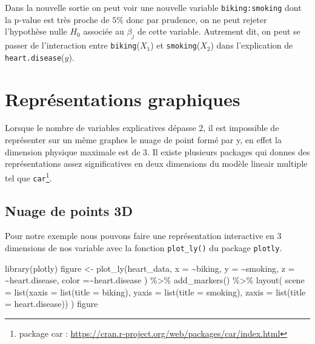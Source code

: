 \documentclass[
]{book}
\newenvironment{Shaded}{\begin{snugshade}}{\end{snugshade}}
\newcommand{\AttributeTok}[1]{\textcolor[rgb]{0.77,0.63,0.00}{#1}}
\newcommand{\FunctionTok}[1]{\textcolor[rgb]{0.00,0.00,0.00}{#1}}
\newcommand{\NormalTok}[1]{#1}
\newcommand{\OtherTok}[1]{\textcolor[rgb]{0.56,0.35,0.01}{#1}}
\newcommand{\SpecialCharTok}[1]{\textcolor[rgb]{0.00,0.00,0.00}{#1}}
\newcommand{\StringTok}[1]{\textcolor[rgb]{0.31,0.60,0.02}{#1}}
\begin{document}
Dans la nouvelle sortie on peut voir une nouvelle variable \texttt{biking:smoking} dont la p-value est très proche de \(5\%\) donc par prudence, on ne peut rejeter l'hypothèse nulle \(H_0\) associée au \(\beta_j\) de cette variable. Autrement dit, on peut se passer de l'interaction entre \texttt{biking}(\(X_1\)) et \texttt{smoking}(\(X_2\)) dans l'explication de \texttt{heart.disease}(\(y\)).

\hypertarget{repruxe9sentations-graphiques-1}{%
\section{Représentations graphiques}\label{repruxe9sentations-graphiques-1}}

Lorsque le nombre de variables explicatives dépasse 2, il est impossible de représenter sur un même graphes le nuage de point formé par y, en effet la dimension physique maximale est de 3.
Il existe plusieurs packages qui donnes des représentations assez significatives en deux dimensions du modèle lineair multiple tel que \texttt{car}\footnote{package car : \url{https://cran.r-project.org/web/packages/car/index.html}}.

\hypertarget{nuage-de-points-3d}{%
\subsection{Nuage de points 3D}\label{nuage-de-points-3d}}

Pour notre exemple nous pouvons faire une représentation interactive en 3 dimensions de nos variable avec la fonction \texttt{plot\_ly()} du package \texttt{plotly}.

\begin{Shaded}
\begin{Highlighting}[]
\FunctionTok{library}\NormalTok{(plotly)}
\NormalTok{figure }\OtherTok{\textless{}{-}} \FunctionTok{plot\_ly}\NormalTok{(heart\_data, }\AttributeTok{x =} \SpecialCharTok{\textasciitilde{}}\NormalTok{biking, }\AttributeTok{y =} \SpecialCharTok{\textasciitilde{}}\NormalTok{smoking, }\AttributeTok{z =} \SpecialCharTok{\textasciitilde{}}\NormalTok{heart.disease, }
   \AttributeTok{color =}\SpecialCharTok{\textasciitilde{}}\NormalTok{heart.disease}
\NormalTok{  ) }\SpecialCharTok{\%\textgreater{}\%}
  \FunctionTok{add\_markers}\NormalTok{() }\SpecialCharTok{\%\textgreater{}\%}
  \FunctionTok{layout}\NormalTok{(}
    \AttributeTok{scene =} \FunctionTok{list}\NormalTok{(}\AttributeTok{xaxis =} \FunctionTok{list}\NormalTok{(}\AttributeTok{title =} \StringTok{\textquotesingle{}biking\textquotesingle{}}\NormalTok{),}
        \AttributeTok{yaxis =} \FunctionTok{list}\NormalTok{(}\AttributeTok{title =} \StringTok{\textquotesingle{}smoking\textquotesingle{}}\NormalTok{),}
        \AttributeTok{zaxis =} \FunctionTok{list}\NormalTok{(}\AttributeTok{title =} \StringTok{\textquotesingle{}heart.disease\textquotesingle{}}\NormalTok{))}
\NormalTok{        )}
\NormalTok{figure}
\end{Highlighting}
\end{Shaded}
\end{document}
